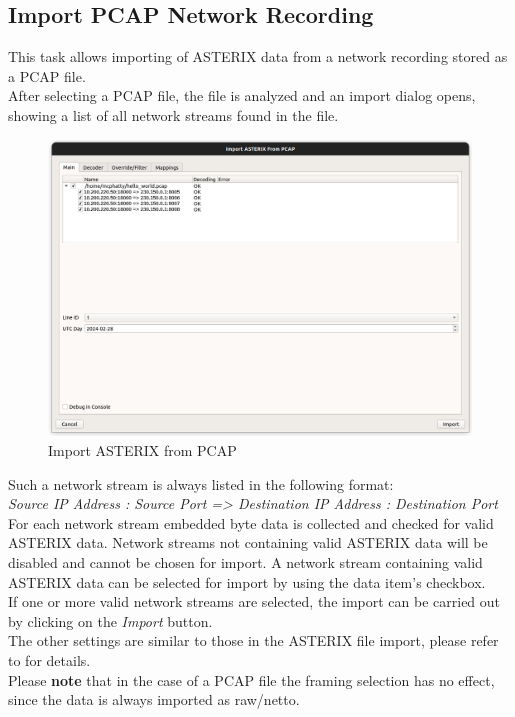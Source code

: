 \subsection{Import PCAP Network Recording}
\label{sec:ui_import_pcap}

This task allows importing of ASTERIX data from a network recording stored as a PCAP file. \\

After selecting a PCAP file, the file is analyzed and an import dialog opens, showing a list of all network streams
found in the file. 

\begin{figure}[H]
    \center
      \hspace*{-0.5cm}
      \includegraphics[width=17cm]{figures/asterix_import_pcap.png}
    \caption{Import ASTERIX from PCAP}
  \end{figure}

Such a network stream is always listed in the following format: \\

\textit{Source IP Address : Source Port => Destination IP Address : Destination Port} \\

For each network stream embedded byte data is collected and checked for valid ASTERIX data.
Network streams not containing valid ASTERIX data will be disabled and cannot be chosen for import.
A network stream containing valid ASTERIX data can be selected for import by using the data item's checkbox. \\

If one or more valid network streams are selected, the import can be carried out by clicking on the \textit{Import} button. \\

The other settings are similar to those in the ASTERIX file import, please refer to  for details. \\

Please \textbf{note} that in the case of a PCAP file the framing selection has no effect, since the data is always imported as raw/netto.

